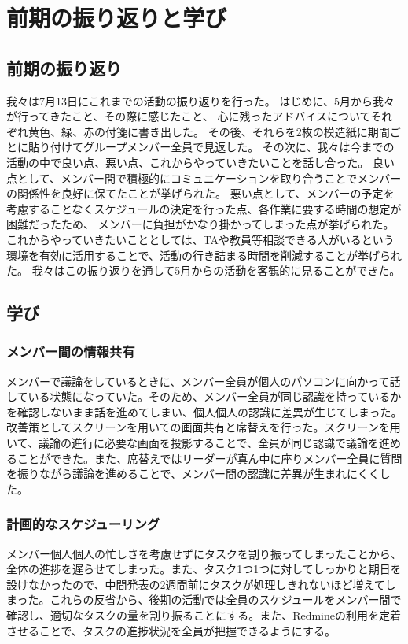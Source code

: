 \chapter{前期の振り返りと学び}

\section{前期の振り返り}
我々は7月13日にこれまでの活動の振り返りを行った。
はじめに、5月から我々が行ってきたこと、その際に感じたこと、
心に残ったアドバイスについてそれぞれ黄色、緑、赤の付箋に書き出した。
その後、それらを2枚の模造紙に期間ごとに貼り付けてグループメンバー全員で見返した。
その次に、我々は今までの活動の中で良い点、悪い点、これからやっていきたいことを話し合った。
良い点として、メンバー間で積極的にコミュニケーションを取り合うことでメンバーの関係性を良好に保てたことが挙げられた。
悪い点として、メンバーの予定を考慮することなくスケジュールの決定を行った点、各作業に要する時間の想定が困難だったため、
メンバーに負担がかなり掛かってしまった点が挙げられた。
これからやっていきたいこととしては、TAや教員等相談できる人がいるという環境を有効に活用することで、活動の行き詰まる時間を削減することが挙げられた。
我々はこの振り返りを通して5月からの活動を客観的に見ることができた。

\section{学び}
\subsection{メンバー間の情報共有}
メンバーで議論をしているときに、メンバー全員が個人のパソコンに向かって話している状態になっていた。そのため、メンバー全員が同じ認識を持っているかを確認しないまま話を進めてしまい、個人個人の認識に差異が生じてしまった。改善策としてスクリーンを用いての画面共有と席替えを行った。スクリーンを用いて、議論の進行に必要な画面を投影することで、全員が同じ認識で議論を進めることができた。また、席替えではリーダーが真ん中に座りメンバー全員に質問を振りながら議論を進めることで、メンバー間の認識に差異が生まれにくくした。
\subsection{計画的なスケジューリング}
メンバー個人個人の忙しさを考慮せずにタスクを割り振ってしまったことから、全体の進捗を遅らせてしまった。また、タスク1つ1つに対してしっかりと期日を設けなかったので、中間発表の2週間前にタスクが処理しきれないほど増えてしまった。これらの反省から、後期の活動では全員のスケジュールをメンバー間で確認し、適切なタスクの量を割り振ることにする。また、Redmineの利用を定着させることで、タスクの進捗状況を全員が把握できるようにする。
